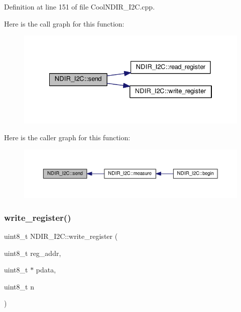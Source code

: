Definition at line 151 of file Cool\+N\+D\+I\+R\+\_\+\+I2\+C.\+cpp.

Here is the call graph for this function\+:
\nopagebreak
\begin{figure}[H]
\begin{center}
\leavevmode
\includegraphics[width=334pt]{class_n_d_i_r___i2_c_aab0c04c2b7d08e99d12af044df179f0c_cgraph}
\end{center}
\end{figure}
Here is the caller graph for this function\+:
\nopagebreak
\begin{figure}[H]
\begin{center}
\leavevmode
\includegraphics[width=350pt]{class_n_d_i_r___i2_c_aab0c04c2b7d08e99d12af044df179f0c_icgraph}
\end{center}
\end{figure}
\mbox{\label{class_n_d_i_r___i2_c_a5de6a044b00e985f035edca07521e319}} 
\subsubsection{\texorpdfstring{write\+\_\+register()}{write\_register()}\hspace{0.1cm}{\footnotesize\ttfamily [1/2]}}
{\footnotesize\ttfamily uint8\+\_\+t N\+D\+I\+R\+\_\+\+I2\+C\+::write\+\_\+register (\begin{DoxyParamCaption}\item[{uint8\+\_\+t}]{reg\+\_\+addr,  }\item[{uint8\+\_\+t $\ast$}]{pdata,  }\item[{uint8\+\_\+t}]{n }\end{DoxyParamCaption})\hspace{0.3cm}{\ttfamily [private]}}




